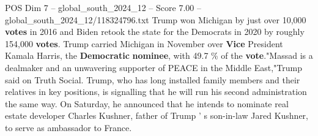\begin{textsample}{POS Dim 7 – global\_south\_2024\_12 – Score 7.00 – global\_south\_2024\_12/118324796.txt}
Trump won Michigan by just over 10,000 \textbf{votes} in 2016 and Biden retook the state for the Democrats in 2020 by roughly 154,000 \textbf{votes}.
Trump carried Michigan in November over \textbf{Vice} President Kamala Harris, the \textbf{Democratic} \textbf{nominee}, with 49.7 \% of the \textbf{vote}."Massad is a dealmaker and an unwavering supporter of PEACE in the Middle East,"Trump said on Truth Social.
Trump, who has long installed family members and their relatives in key positions, is signalling that he will run his second administration the same way.
On Saturday, he announced that he intends to nominate real estate developer Charles Kushner, father of Trump ' s son-in-law Jared Kushner, to serve as ambassador to France.

\end{textsample}
